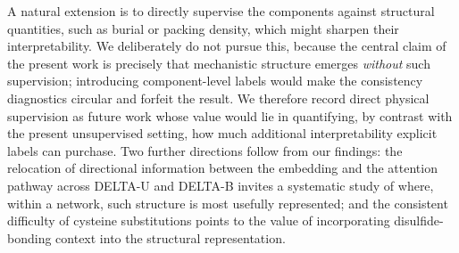 \documentclass[11pt,a4paper]{article}
\theoremstyle{plain}
\theoremstyle{definition}
\begin{document}
A natural extension is to directly supervise the components against structural quantities, such as burial or packing density, which might sharpen their interpretability. We deliberately do not pursue this, because the central claim of the present work is precisely that mechanistic structure emerges \emph{without} such supervision; introducing component-level labels would make the consistency diagnostics circular and forfeit the result. We therefore record direct physical supervision as
future work whose value would lie in quantifying, by contrast with the present unsupervised setting, how much additional interpretability explicit labels can purchase. Two further directions follow from our findings: the relocation of directional information between the embedding and the attention pathway across DELTA-U and DELTA-B invites a systematic study of where, within a network, such structure is most usefully represented; and the consistent difficulty of cysteine substitutions points to the value of incorporating disulfide-bonding context into the structural representation.
\end{document}
